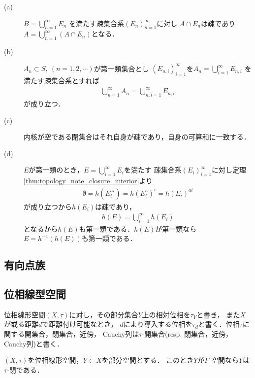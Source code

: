 	\begin{prf}\mbox{}
		\begin{description}
			\item[(a)] $B = \bigcup_{n=1}^\infty E_n$
				を満たす疎集合系$(E_n)_{n=1}^\infty$に対し
				$A \cap E_n$は疎であり$A = \bigcup_{n=1}^\infty (A \cap E_n)$となる．
			\item[(b)] $A_n \subset S,\ (n=1,2,\cdots)$が第一類集合とし
				$(E_{n,i})_{i=1}^\infty$を$A_n = \bigcup_{i=1}^\infty E_{n,i}$
				を満たす疎集合系とすれば
				\begin{align}
					\bigcup_{n=1}^\infty A_n
					= \bigcup_{n,i=1}^\infty E_{n,i}
				\end{align}
				が成り立つ．
				
			\item[(c)] 内核が空である閉集合はそれ自身が疎であり，自身の可算和に一致する．
			\item[(d)] $E$が第一類のとき，$E = \bigcup_{i=1}^\infty E_i$を満たす
				疎集合系$(E_i)_{i=1}^\infty$に対し定理\ref{thm:topology_note_closure_interior}より
				\begin{align}
					\emptyset = h(E_i^{ai})
					= h(E_i^a)^i
					= h(E_i)^{ai}
				\end{align}
				が成り立つから$h(E_i)$は疎であり，
				\begin{align}
					h(E) = \bigcup_{i=1}^\infty h(E_i)
				\end{align}
				となるから$h(E)$も第一類である．$h(E)$が第一類なら$E = h^{-1}(h(E))$も第一類である．
				\QED
		\end{description}
	\end{prf}
	
\subsection{有向点族}
\subsection{位相線型空間}
	
	位相線形空間$(X,\tau)$に対し，その部分集合$Y$上の相対位相を$\tau_Y$と書き，
	また$X$が或る距離$d$で距離付け可能なとき，
	$d$により導入する位相を$\tau_d$と書く．位相$\tau$に関する開集合，閉集合，近傍，
	Cauchy列は$\tau$-開集合(resp. 閉集合，近傍，Cauchy列)と書く．
	
	\begin{screen}
		\begin{thm}
			$(X,\tau)$を位相線形空間，$Y \subset X$を部分空間とする．
			このとき$Y$が$F$-空間なら$Y$は$\tau$-閉である．
		\end{thm}
	\end{screen}
	
